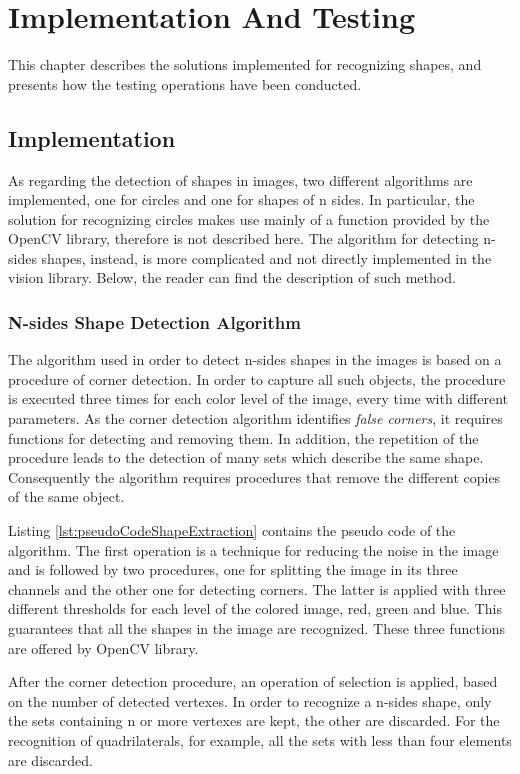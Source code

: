 \chapter{Implementation And Testing}\label{impl_test}
	This chapter describes the solutions implemented for recognizing shapes, and presents how the testing operations have been conducted.
	
	
	\section{Implementation}
		As regarding the detection of shapes in images, two different algorithms are implemented, one for circles and one for shapes of n sides.
		In particular, the solution for recognizing circles makes use mainly of a function provided by the \mbox{OpenCV} library, therefore is not described here.
		The algorithm for detecting n-sides shapes, instead, is more complicated and not directly implemented in the vision library. 
		Below, the reader can find the description of such method.
	
		\subsection{N-sides Shape Detection Algorithm}
		The algorithm used in order to detect n-sides shapes in the images is based on a procedure of corner detection. 
		In order to capture all such objects, the procedure is executed three times for each color level of the image, every time with different parameters.
		As the corner detection algorithm identifies \emph{false corners}, it requires functions for detecting and removing them. 
		In addition, the repetition of the procedure leads to the detection of many sets which describe the same shape.	
		Consequently the algorithm requires procedures that remove the different copies of the same object.


		
		Listing \ref{lst:pseudoCodeShapeExtraction} contains the pseudo code of the algorithm.
		The first operation is a technique for reducing the noise in the image and is followed by two procedures, one for splitting the image in its three channels and the other one for detecting corners.
		The latter is applied with three different thresholds for each level of the colored image, red, green and blue.
		This guarantees that all the shapes in the image are recognized.
		These three functions are offered by \mbox{OpenCV} library.

		
		After the corner detection procedure, an operation of selection is applied, based on the number of detected vertexes.
		In order to recognize a n-sides shape, only the sets containing n or more vertexes are kept, the other are discarded.
		For the recognition of quadrilaterals, for example, all the sets with less than four elements are discarded.
		
